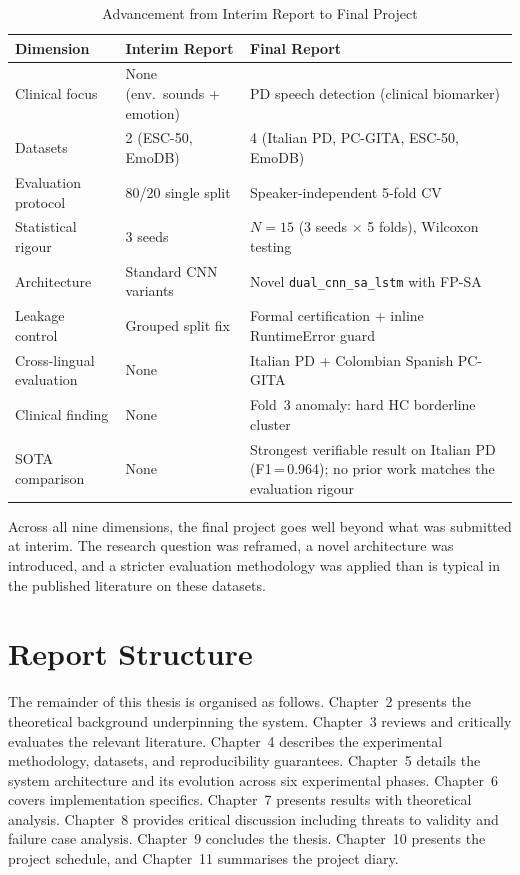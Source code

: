 \documentclass[oneside,openany]{final_report}
\newcommand{\dualcnn}{\texttt{dual\_cnn\_sa\_lstm}}
\begin{document}
\begin{table}[H]
\centering
\caption{Advancement from Interim Report to Final Project}
\label{tab:advancement}
\small
\begin{tabularx}{\textwidth}{l X X}
\toprule
\textbf{Dimension} & \textbf{Interim Report} & \textbf{Final Report} \\
\midrule
Clinical focus & None (env.\ sounds + emotion) & PD speech detection (clinical biomarker) \\
Datasets & 2 (ESC-50, EmoDB) & 4 (Italian PD, PC-GITA, ESC-50, EmoDB) \\
Evaluation protocol & 80/20 single split & Speaker-independent 5-fold CV \\
Statistical rigour & 3 seeds & $N\!=\!15$ (3 seeds $\times$ 5 folds), Wilcoxon testing \\
Architecture & Standard CNN variants & Novel \dualcnn{} with FP-SA \\
Leakage control & Grouped split fix & Formal certification + inline RuntimeError guard \\
Cross-lingual evaluation & None & Italian PD + Colombian Spanish PC-GITA \\
Clinical finding & None & Fold~3 anomaly: hard HC borderline cluster \\
SOTA comparison & None & Strongest verifiable result on Italian PD (F1\,=\,0.964); no prior work matches the evaluation rigour \\
\bottomrule
\end{tabularx}
\end{table}

Across all nine dimensions, the final project goes well beyond what was submitted at interim. The research question was reframed, a novel architecture was introduced, and a stricter evaluation methodology was applied than is typical in the published literature on these datasets.

\section{Report Structure}

The remainder of this thesis is organised as follows. Chapter~2 presents the theoretical background underpinning the system. Chapter~3 reviews and critically evaluates the relevant literature. Chapter~4 describes the experimental methodology, datasets, and reproducibility guarantees. Chapter~5 details the system architecture and its evolution across six experimental phases. Chapter~6 covers implementation specifics. Chapter~7 presents results with theoretical analysis. Chapter~8 provides critical discussion including threats to validity and failure case analysis. Chapter~9 concludes the thesis. Chapter~10 presents the project schedule, and Chapter~11 summarises the project diary.
\end{document}
